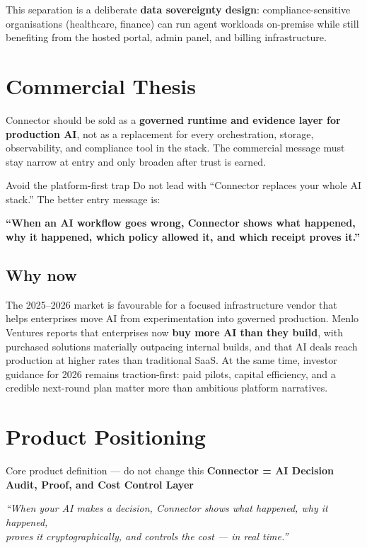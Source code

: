 This separation is a deliberate \textbf{data sovereignty design}:
compliance-sensitive organisations (healthcare, finance) can run agent workloads
on-premise while still benefiting from the hosted portal, admin panel, and
billing infrastructure.

\section{Commercial Thesis}

Connector should be sold as a \textbf{governed runtime and evidence layer for
production AI}, not as a replacement for every orchestration, storage,
observability, and compliance tool in the stack. The commercial message must
stay narrow at entry and only broaden after trust is earned.

\begin{warnbox}{Avoid the platform-first trap}
Do not lead with ``Connector replaces your whole AI stack.'' The better entry
message is:

\smallskip
\centering
\textbf{``When an AI workflow goes wrong, Connector shows what happened, why it
happened, which policy allowed it, and which receipt proves it.''}
\end{warnbox}

\subsection{Why now}

The 2025--2026 market is favourable for a focused infrastructure vendor that
helps enterprises move AI from experimentation into governed production.
Menlo Ventures reports that enterprises now \textbf{buy more AI than they
build}, with purchased solutions materially outpacing internal builds, and that
AI deals reach production at higher rates than traditional SaaS. At the same
time, investor guidance for 2026 remains traction-first: paid pilots, capital
efficiency, and a credible next-round plan matter more than ambitious platform
narratives.

\section{Product Positioning}

\begin{conceptbox}{Core product definition --- do not change this}
\centering
\large\bfseries Connector = AI Decision Audit, Proof, and Cost Control Layer

\smallskip
\normalsize\normalfont\itshape
``When your AI makes a decision, Connector shows what happened, why it happened,\\
proves it cryptographically, and controls the cost --- in real time.''
\end{conceptbox}

